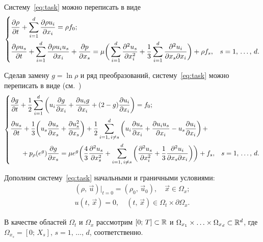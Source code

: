 Систему~\eqref{eq:task} можно переписать в виде
\begin{equation*} 
\label{eq:intermediate}
\begin{dcases}
    \dfrac{\partial \rho}{\partial t} + \sum_{i = 1}^{d} \dfrac{\partial \rho u_i}{\partial x_i} = \rho f_0; \\
    \dfrac{\partial \rho u_s}{\partial t} + \sum_{i = 1}^{d} \dfrac{\partial \rho u_i u_s}{\partial x_i} + \dfrac{\partial p}{\partial x_s} = \mu \bigg( \sum_{i = 1}^{d} \dfrac{\partial ^2 u_s}{\partial x_i^2} + \frac{1}{3} \sum_{i = 1}^{d} \dfrac{\partial ^2 u_i}{\partial x_s \partial x_i} \bigg) + \rho f_s, & s = 1, \, \ldots, \, d.
\end{dcases}
\end{equation*}

Сделав замену $g = \ln \rho$ и ряд преобразований, систему~\eqref{eq:task} можно переписать в виде (см.~\cite{Popov})
\begin{equation} 
\label{eq:main}
\begin{dcases}
    \deriv{g}{t} + \frac{1}{2} \sum_{i = 1}^{d} \bigg( u_i \deriv{g}{x_i} + \deriv{u_i g}{x_i} + (2 - g) \deriv{u_i}{x_i} \bigg) = f_0; \\
    \begin{multlined}[b]
    \deriv{u_s}{t} + \frac{1}{3} \bigg( u_s \deriv{u_s}{x_s} + \deriv{u_s^2}{x_s} \bigg) + \frac{1}{2} \sum_{i = 1, \, i \not = s}^{d} \bigg( u_i \deriv{u_s}{x_i} + \deriv{u_i u_s}{x_i} - u_s \deriv{u_i}{x_i} \bigg) \, + \\ + p_\rho (e^g) \deriv{g}{x_s} = \mu e^g \bigg( \frac{4}{3} \deriv{^2 u_s}{x_s^2} + \sum_{i = 1, \, i \not = s}^{d} \bigg( \deriv{^2 u_s}{x_i^2} + \frac{1}{3} \deriv{^2 u_i}{x_s \partial x_i} \bigg) \bigg) + f_s,
    \end{multlined}
    & s = 1, \, \ldots, \, d.
\end{dcases}
\end{equation}

Дополним систему~\eqref{eq:task} начальными и граничными условиями:
\begin{equation} \label{eq:terms}
\begin{aligned}
    (\rho, \, \vec{u})|_{t = 0} = (\rho_0, \, \vec{u}_0), \quad \vec{x} \in \Omega_x; \\
    u (t, \, \vec{x}) = 0, \quad (t, \, \vec{x}) \in \Omega_t \times \partial \Omega_x.
\end{aligned}
\end{equation}

В качестве областей $\Omega_t$ и $\Omega_x$ рассмотрим $[0; \, T] \subset \mathbb{R}$ и $\Omega_{x_1} \times \ldots \times \Omega_{x_d} \subset \mathbb{R}^d$, где $\Omega_{x_s} = [0; \, X_s]$, $s = 1, \, \ldots, \, d$, соответственно.




